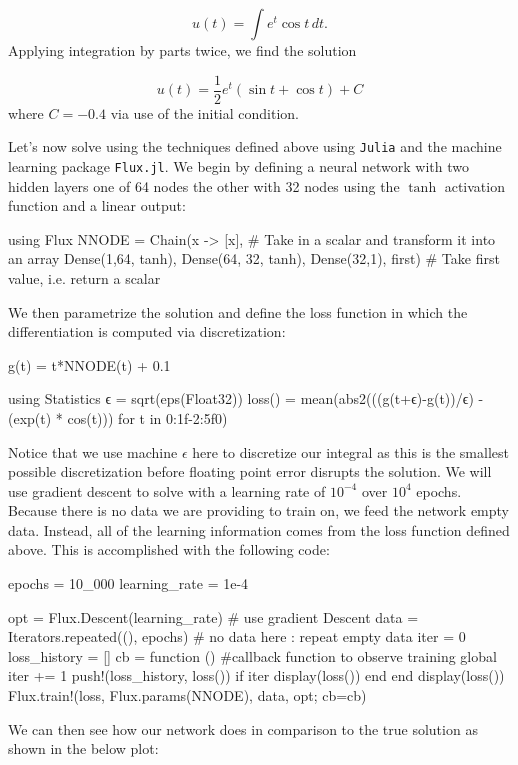 \documentclass{CUP-JNL-DTM}%
\theoremstyle{definition}
\numberwithin{equation}{section}
\newcommand{\Julia}{\texttt{Julia} }
\begin{document}
\begin{equation}
	u(t) = \int e^t \cos t \, dt. 
\end{equation}
Applying integration by parts twice, we find the solution

\begin{equation}
	u(t) = \frac{1}{2}e^t(\sin t + \cos t) + C
\end{equation}
where $C = -0.4$ via use of the initial condition. 

Let's now solve using the techniques defined above using \Julia and the machine learning package \texttt{Flux.jl}. We begin by defining a neural network with two hidden layers one of 64 nodes the other with 32 nodes using the $\tanh$ activation function and a linear output: 

\begin{jllisting}
using Flux
NNODE = Chain(x -> [x], # Take in a scalar and transform it into an array
           Dense(1,64, tanh),
           Dense(64, 32, tanh),
           Dense(32,1),
           first) # Take first value, i.e. return a scalar
\end{jllisting}
We then parametrize the solution and define the loss function in which the differentiation is computed via discretization:

\begin{jllisting}
g(t) = t*NNODE(t) + 0.1

using Statistics
ϵ = sqrt(eps(Float32))
loss() = mean(abs2(((g(t+ϵ)-g(t))/ϵ) - (exp(t) * cos(t))) for t in 0:1f-2:5f0)
\end{jllisting}
Notice that we use machine $\epsilon$ here to discretize our integral as this is the smallest possible discretization before floating point error disrupts the solution. We will use gradient descent to solve with a learning rate of $10^{-4}$ over $10^4$ epochs. Because there is no data we are providing to train on, we feed the network empty data. Instead, all of the learning information comes from the loss function defined above. This is accomplished with the following code:

\begin{jllisting}
epochs = 10_000
learning_rate = 1e-4

opt = Flux.Descent(learning_rate) # use gradient Descent
data = Iterators.repeated((), epochs) # no data here : repeat empty data
iter = 0
loss_history = []
cb = function () #callback function to observe training
  global iter += 1
  push!(loss_history, loss())
  if iter %
    display(loss())
  end
end
display(loss())
Flux.train!(loss, Flux.params(NNODE), data, opt; cb=cb)
\end{jllisting}
We can then see how our network does in comparison to the true solution as shown in the below plot:
\end{document}
